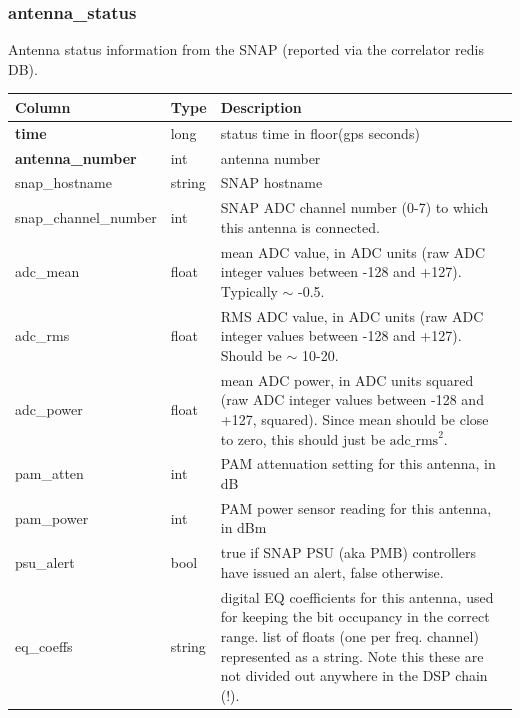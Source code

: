 \documentclass{article}
\begin{document}
{\subsubsection{antenna\_status}
Antenna status information from the SNAP (reported via the correlator redis DB).
\begin{center}
 \begin{tabular}{| p{4cm} | p{2cm} | p{10cm} |}
\hline
 {\bf Column} & {\bf Type}  & {\bf Description} \\ [0.5ex]  \hline\hline
\textbf{time} & long & status time in floor(gps seconds)\\ \hline
\textbf{antenna\_number} & int & antenna number \\ \hline
snap\_hostname & string & SNAP hostname \\ \hline
snap\_channel\_number & int & SNAP ADC channel number (0-7) to which this antenna is connected. \\ \hline
adc\_mean & float & mean ADC value, in ADC units (raw ADC integer values between -128 and +127). Typically $\sim$ -0.5. \\ \hline
adc\_rms & float & RMS ADC value, in ADC units (raw ADC integer values between -128 and +127).  Should be $\sim$ 10-20. \\ \hline
adc\_power & float & mean ADC power, in ADC units squared (raw ADC integer values between -128 and +127, squared). Since mean should be close to zero, this should just be $\text{adc\_rms}^2$. \\ \hline
pam\_atten & int & PAM attenuation setting for this antenna, in dB \\ \hline
pam\_power & int & PAM power sensor reading for this antenna, in dBm \\ \hline
psu\_alert & bool & true if SNAP PSU (aka PMB) controllers have issued an alert, false otherwise. \\ \hline
eq\_coeffs & string & digital EQ coefficients for this antenna, used for keeping the bit occupancy in the
            correct range. list of floats (one per freq. channel) represented as a string. Note this these are
            not divided out anywhere in the DSP chain (!). \\\hline
\end{tabular}
\end{center}

}
\end{document}
